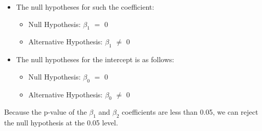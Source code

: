 \documentclass[12pt,letterpaper]{article}
\begin{document}
\begin{enumerate}
\begin{itemize}
	\item  The null hypotheses for such the coefficient:
	\begin{itemize}
		\item {Null Hypothesis: $\beta_1$ $=$ 0}
		\item {Alternative Hypothesis: $\beta_1$ $\neq$ 0}
	\end{itemize}
	
	\item The null hypotheses for the intercept is as follows:
	\begin{itemize}
		\item {Null Hypothesis: $\beta_0$ $=$ 0}
		\item {Alternative Hypothesis: $\beta_0$ $\neq$ 0}
	\end{itemize}
	
\end{itemize}

\begin{flushleft}Because the p-value of the $\beta_1$ and $\beta_2$ coefficients are less than 0.05, we can reject the null hypothesis at the 0.05 level.
\end{flushleft}

	\end{enumerate}
	
	
	
\end{document}
